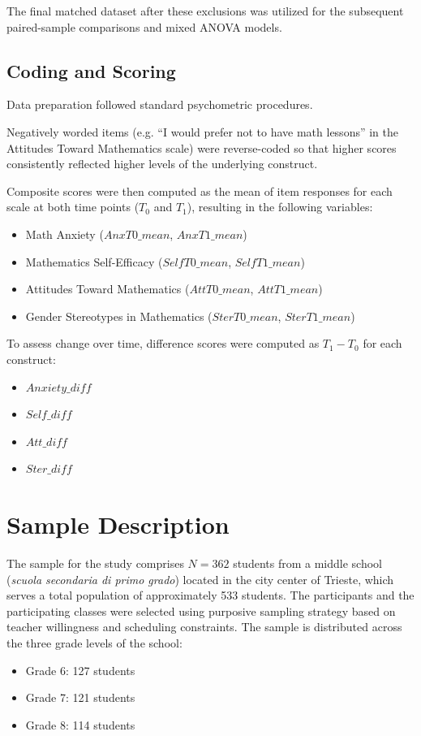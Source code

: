 The final matched dataset after these exclusions was utilized for the subsequent paired-sample comparisons and mixed ANOVA models.

\subsection{Coding and Scoring}
Data preparation followed standard psychometric procedures.

Negatively worded items (e.g. ``I would prefer not to have math lessons'' in the Attitudes Toward Mathematics scale) were reverse-coded so that higher scores consistently reflected higher levels of the underlying construct.

Composite scores were then computed as the mean of item responses for each scale at both time points ($T_0$ and $T_1$), resulting in the following variables:
\begin{itemize}
  \item Math Anxiety ($AnxT0\_mean$, $AnxT1\_mean$) 
  \item Mathematics Self-Efficacy ($SelfT0\_mean$, $SelfT1\_mean$)
  \item Attitudes Toward Mathematics ($AttT0\_mean$, $AttT1\_mean$)
  \item Gender Stereotypes in Mathematics ($SterT0\_mean$, $SterT1\_mean$)
\end{itemize}

To assess change over time, difference scores were computed as $T_1 - T_0$ for each construct:
\begin{itemize}
  \item $Anxiety\_diff$
  \item $Self\_diff$
  \item $Att\_diff$
  \item $Ster\_diff$
\end{itemize}


\section{Sample Description}
The sample for the study comprises $N = 362$ students from a middle school (\textit{scuola secondaria di primo grado}) located in the city center of Trieste, which serves a total population of approximately 533 students. The participants and the participating classes were selected using purposive sampling strategy based on teacher willingness and scheduling constraints. The sample is distributed across the three grade levels of the school: 
\begin{itemize}
\item Grade 6: 127 students
\item Grade 7: 121 students
\item Grade 8: 114 students
\end{itemize}

